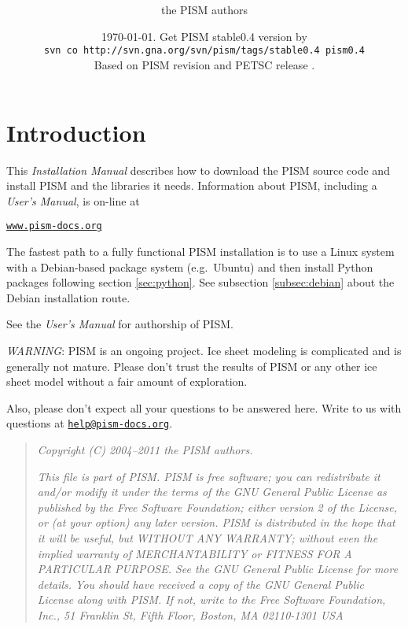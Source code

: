 \documentclass[11pt,final]{amsart}
\title[PISM Installation Manual]{\protect{\Large \emph{PISM}, a Parallel Ice
    Sheet Model:\normalsize} \\ \protect{\Large \bigskip \bigskip Installation
    Manual\normalsize}}
\author[]{the PISM authors}
\date{\today.  Get PISM stable0.4 version by \\
\phantom{foobar} \qquad\texttt{svn co http://svn.gna.org/svn/pism/tags/stable0.4 pism0.4} \\
Based on PISM revision \PISMREV\quad and PETSC release \PETSCREL.}
\renewcommand{\t}[1]{\texttt{#1}}
\begin{document}
\maketitle
\thispagestyle{empty}

\vspace{1.5in}
\setcounter{tocdepth}{2}
\tableofcontents



\newpage
\section*{Introduction}

\large
This \emph{Installation Manual} describes how to download the PISM source code and install PISM and the libraries it needs.  Information about PISM, including a \emph{User's Manual}, is on-line at
\bigskip
\begin{center}
  \href{http://www.pism-docs.org}{\t{www.pism-docs.org}}
\end{center}
\bigskip
\noindent The fastest path to a fully functional PISM installation is to use a Linux system with a Debian-based package system (e.g.~Ubuntu) and then install Python packages following section \ref{sec:python}.  See subsection \ref{subsec:debian} about the Debian installation route.

\bigskip
See the \emph{User's Manual} for authorship of PISM.
\vfill

\large
\begin{center}
\parbox{5.5in}{ \emph{WARNING}:  PISM is an ongoing project.  Ice sheet modeling is complicated and is generally not mature.  Please don't trust the results of PISM or any other ice sheet model without a fair amount of exploration.

\bigskip
Also, please don't expect all your questions to be answered here.  Write to us with questions at \href{mailto:help@pism-docs.org}{\texttt{help@pism-docs.org}}.}
\normalsize
\end{center}
\normalsize
\vfill

\begin{quote}
\textsl{Copyright (C) 2004--2011 the PISM authors.}
\medskip

\noindent \textsl{This file is part of PISM.  PISM is free software; you can redistribute it and/or modify it under the terms of the GNU General Public
  License as published by the Free Software Foundation; either version 2 of the License, or (at your option) any later version.  PISM is distributed in the hope that it will be useful, but WITHOUT ANY WARRANTY; without even the implied
  warranty of MERCHANTABILITY or FITNESS FOR A PARTICULAR PURPOSE. See the GNU General Public License for more details.  You should have received a copy of the GNU General Public License along with PISM. If not, write to the Free Software Foundation, Inc., 51 Franklin St, Fifth Floor, Boston, MA 02110-1301 USA}
\end{quote}
\end{document}
